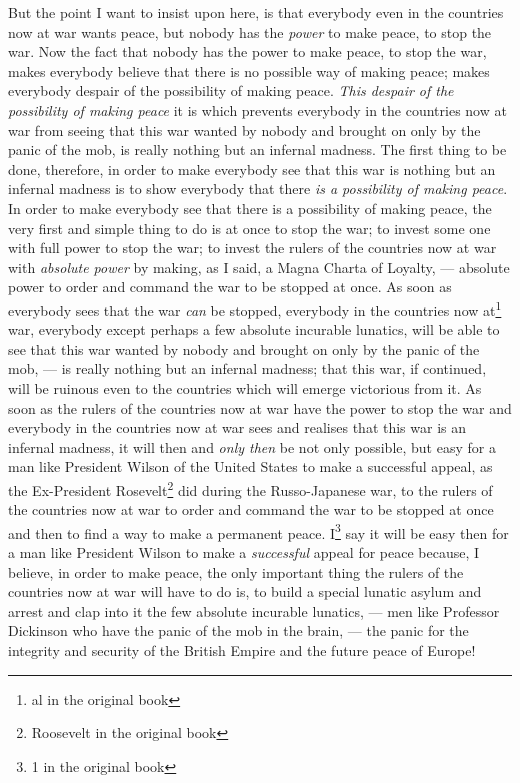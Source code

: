 But the point I want to insist upon here, is that everybody even in the countries now at war wants peace, but nobody has the \emph{power} to make peace, to stop the war.
Now the fact that nobody has the power to make peace, to stop the war, makes everybody believe that there is no possible way of making peace; makes everybody despair of the possibility of making peace.
\emph{This despair of the possibility of making peace} it is which prevents everybody in the countries now at war from seeing that this war wanted by nobody and brought on only by the panic of the mob, is really nothing but an infernal madness.
The first thing to be done, therefore, in order to make everybody see that this war is nothing but an infernal madness is to show everybody that there \emph{is a possibility of making peace}.
In order to make everybody see that there is a possibility of making peace, the very first and simple thing to do is at once to stop the war; to invest some one with full power to stop the war; to invest the rulers of the countries now at war with \emph{absolute power} by making, as I said, a Magna Charta of Loyalty, --- absolute power to order and command the war to be stopped at once.
As soon as everybody sees that the war \emph{can} be stopped, everybody in the countries now at\footnote{al in the original book} war, everybody except perhaps a few absolute incurable lunatics, will be able to see that this war wanted by nobody and brought on only by the panic of the mob, --- is really nothing but an infernal madness; that this war, if continued, will be ruinous even to the countries which will emerge victorious from it.
As soon as the rulers of the countries now at war have the power to stop the war and everybody in the countries now at war sees and realises that this war is an infernal madness, it will then and \emph{only then} be not only possible, but easy for a man like President Wilson  of the United States to make a successful appeal, as the Ex-President Rosevelt\footnote{Roosevelt in the original book} did during the Russo-Japanese war, to the rulers of the countries now at war to order and command the war to be stopped at once and then to find a way to make a permanent peace.
I\footnote{1 in the original book} say it will be easy then for a man like President Wilson to make a \emph{successful} appeal for peace because, I believe, in order to make peace, the only important thing the rulers of the countries now at war will have to do is, to build a special lunatic asylum and arrest and clap into it the few absolute incurable lunatics, --- men like Professor Dickinson who have the panic of the mob in the brain, --- the panic for the integrity and security of the British Empire and the future peace of Europe!

